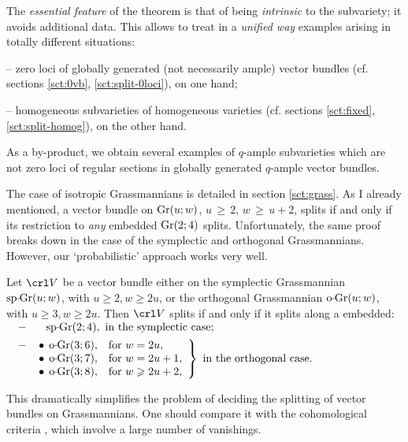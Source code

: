 \documentclass[11pt,reqno]{amsart}
\let\unbar\underbar
\let\nit\noindent
\numberwithin{equation}{section}
\numberwithin{figure}{section}
\let\ges\geqslant
\begin{document}
The \emph{essential feature} of the theorem is that of being \emph{intrinsic} 
to the subvariety; it avoids additional data. 
This allows to treat in a \emph{unified way} examples arising 
in totally different situations: 

-- zero loci of globally generated (not necessarily ample) vector bundles 
(cf. sections \ref{sct:0vb}, \ref{sct:split-0loci}), on one hand; 

-- homogeneous subvarieties of homogeneous varieties 
(cf. sections \ref{sct:fixed}, \ref{sct:split-homog}), on the other hand. 

\nit As a by-product, we obtain several examples of $q$-ample subvarieties which 
are not zero loci of regular sections in globally generated $q$-ample vector bundles. 

The case of isotropic Grassmannians is detailed in section \ref{sct:grass}. 
As I already mentioned, a vector bundle on ${{\rm Gr}}(u;w)$, 
$u\,{\ges}\,2,\,w\,{\ges}\,u+2$, splits if and only if its restriction to \emph{any} 
embedded ${{\rm Gr}}(2;4)$ splits. Unfortunately, the same proof breaks down in the 
case of the symplectic and orthogonal Grassmannians. 
However, our `probabilistic' approach works very well. 
\begin{thm-nono}
Let $\crl V$ be a vector bundle either on the symplectic Grassmannian ${{\rm sp{{{\vrule height2.75pt depth-2.35pt width2.3pt \kern1.7pt}}\!}Gr}}(u;w)$, 
with $u\ges 2,w\ges2u$, 
or  the orthogonal Grassmannian ${{\rm o{{{\vrule height2.75pt depth-2.35pt width2.3pt \kern1.7pt}}\!}Gr}}(u;w)$, with $u\ges 3,w\ges2u$. 
Then $\crl V$ splits if and only if it splits along a \unbar{\emph{very generally}} 
embedded: \\[1ex]
$\begin{array}[t]{ll}
	\begin{array}{l}-\;\end{array}
	&
	{{\rm sp{{{\vrule height2.75pt depth-2.35pt width2.3pt \kern1.7pt}}\!}Gr}}(2;4), \text{ in the symplectic case;}
	\\[1ex]  
	\begin{array}{l}-\;\\ \phantom{I}\\ \phantom{I}\end{array}
	&
		\kern-3ex\left.
			\begin{array}{ll}
				\bullet\kern1ex{{\rm o{{{\vrule height2.75pt depth-2.35pt width2.3pt \kern1.7pt}}\!}Gr}}(3;6),&\text{for }w=2u,\\ 
				\bullet\kern1ex{{\rm o{{{\vrule height2.75pt depth-2.35pt width2.3pt \kern1.7pt}}\!}Gr}}(3;7),&\text{for }w=2u+1,\\ 
				\bullet\kern1ex{{\rm o{{{\vrule height2.75pt depth-2.35pt width2.3pt \kern1.7pt}}\!}Gr}}(3;8),&\text{for }w\ges2u+2,
			\end{array}
		\right\}
		\text{ in the orthogonal case.}
\end{array}$ 
\end{thm-nono}
This dramatically simplifies the problem of deciding the splitting of vector bundles 
on Grassmannians. One should compare it with the cohomological criteria 
\cite{ott,ma,ar-ma,ma-oe}, which involve a large number of vanishings.  
\end{document}
